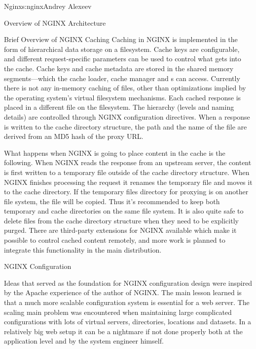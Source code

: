 \begin{aosachapter}{Nginx}{s:nginx}{Andrey Alexeev}
\begin{aosasect1}{Overview of NGINX Architecture}
\begin{aosasect2}{Brief Overview of NGINX Caching}
Caching in NGINX is implemented in the form of hierarchical data
storage on a filesystem. Cache keys are configurable, and different
request-specific parameters can be used to control what gets into the
cache. Cache keys and cache metadata are stored in the shared memory
segments---which the cache loader, cache manager and s
can access. Currently there is not any in-memory caching of files,
other than optimizations implied by the operating system's virtual
filesystem mechanisms. Each cached response is placed in a different
file on the filesystem. The hierarchy (levels and naming details) are
controlled through NGINX configuration directives. When a response is
written to the cache directory structure, the path and the name of the
file are derived from an MD5 hash of the proxy URL.

What happens when NGINX is going to place content in the cache is the
following. When NGINX reads the response from an upstream server, the
content is first written to a temporary file outside of the cache
directory structure. When NGINX finishes processing the request it
renames the temporary file and moves it to the cache directory. If the
temporary files directory for proxying is on another file system, the
file will be copied. Thus it's recommended to keep both temporary and
cache directories on the same file system. It is also quite safe to
delete files from the cache directory structure when they need to be
explicitly purged. There are third-party extensions for NGINX
available which make it possible to control cached content remotely,
and more work is planned to integrate this functionality in the main
distribution.

\end{aosasect2}

\end{aosasect1}

\begin{aosasect1}{NGINX Configuration}

Ideas that served as the foundation for NGINX configuration design
were inspired by the Apache experience of the author of NGINX. The
main lesson learned is that a much more scalable configuration system
is essential for a web server. The scaling main problem was
encountered when maintaining large complicated configurations with
lots of virtual servers, directories, locations and datasets. In a
relatively big web setup it can be a nightmare if not done properly
both at the application level and by the system engineer himself.


\end{aosasect1}
\end{aosachapter}
